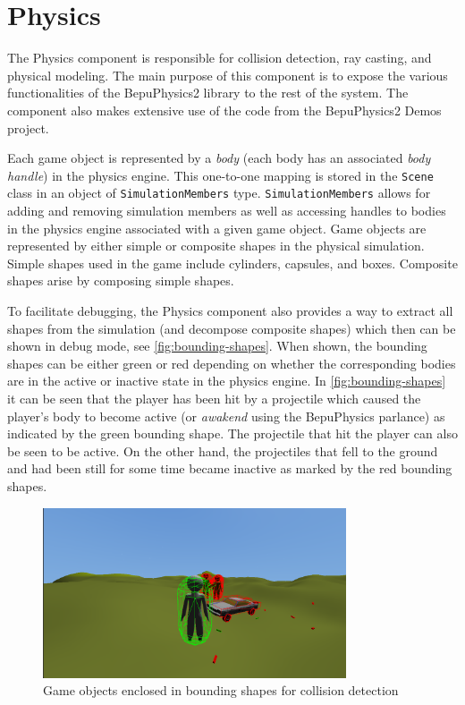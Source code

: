 \section{Physics}
The Physics component is responsible for collision detection, ray casting, and physical modeling.
The main purpose of this component is to expose the various functionalities of the BepuPhysics2 library to the rest of the system.
The component also makes extensive use of the code from the BepuPhysics2 Demos project.

Each game object is represented by a \textit{body} (each body has an associated \textit{body handle}) in the physics engine.
This one-to-one mapping is stored in the \texttt{Scene} class in an object of \texttt{SimulationMembers} type.
\texttt{SimulationMembers} allows for adding and removing simulation members as well as accessing handles to bodies in the physics engine associated with a given game object.
Game objects are represented by either simple or composite shapes in the physical simulation.
Simple shapes used in the game include cylinders, capsules, and boxes.
Composite shapes arise by composing simple shapes.

To facilitate debugging, the Physics component also provides a way to extract all shapes from the simulation (and decompose composite shapes) which then can be shown in debug mode, see \autoref{fig:bounding-shapes}.
When shown, the bounding shapes can be either green or red depending on whether the corresponding bodies are in the active or inactive state in the physics engine.
In \autoref{fig:bounding-shapes} it can be seen that the player has been hit by a projectile which caused the player's body to become active (or \textit{awakend} using the BepuPhysics parlance) as indicated by the green bounding shape.
The projectile that hit the player can also be seen to be active.
On the other hand, the projectiles that fell to the ground and had been still for some time became inactive as marked by the red bounding shapes.
\begin{figure}[h]
    \centering
    \includegraphics[width=0.8\textwidth]{chapters/main_components/sections/physics/resources/bounding-shapes.png}
    \caption{Game objects enclosed in bounding shapes for collision detection}
    \label{fig:bounding-shapes}
\end{figure}

